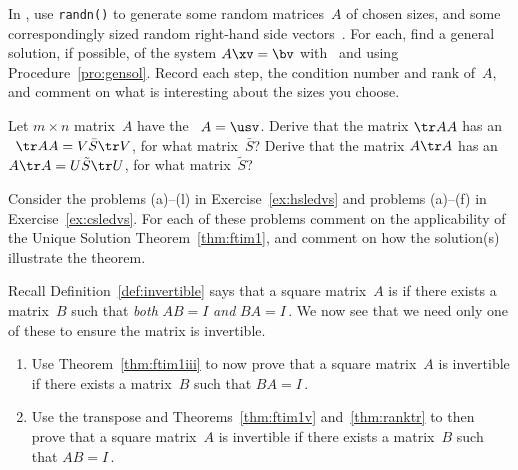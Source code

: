 \begin{exercise} \label{ex:} 
In \script, use \verb|randn()| to generate some random matrices~\(A\) of chosen sizes, and some correspondingly sized random right-hand side vectors~\bv.
For each, find a general solution, if possible, of the system \(A\xv=\bv\) with \script\ and using Procedure~\ref{pro:gensol}.
Record each step, the condition number and rank of~\(A\), and comment on what is interesting about the sizes you choose.
\end{exercise}


\begin{exercise} \label{ex:svdtrAA} 
Let \(m\times n\) matrix~\(A\) have the \svd\ \(A=\usv\).
Derive that the matrix \(\tr AA\) has an \svd\ \(\tr AA=V\bar S\tr V\), for what matrix~\(\bar S\)?
Derive that the matrix \(A\tr A\) has an \svd\ \(A\tr A=U\tilde S\tr U\), for what matrix~\(\tilde S\)?
\end{exercise}




\begin{exercise} \label{ex:} 
Consider the problems (a)--(l) in Exercise~\ref{ex:hsledvs} and problems (a)--(f) in Exercise~\ref{ex:csledvs}.
For each of these problems comment on the applicability of the Unique Solution Theorem~\ref{thm:ftim1}, and comment on how the solution(s) illustrate the theorem.
\end{exercise}



\begin{exercise} \label{ex:} 
Recall Definition~\ref{def:invertible} says that a square matrix~\(A\) is  if there exists a matrix~\(B\) such that \emph{both} \(AB=I\) \emph{and} \(BA=I\)\,.
We now see that we need only one of these to ensure the matrix is invertible.
\begin{enumerate}
\item Use Theorem~\ref{thm:ftim1iii} to now prove that a square matrix~\(A\) is invertible if there exists a matrix~\(B\) such that \(BA=I\)\,.

\item Use the transpose and Theorems~\ref{thm:ftim1v} and~\ref{thm:ranktr} to then prove that a square matrix~\(A\) is invertible if there exists a matrix~\(B\) such that \(AB=I\)\,.
\end{enumerate}
\end{exercise}




